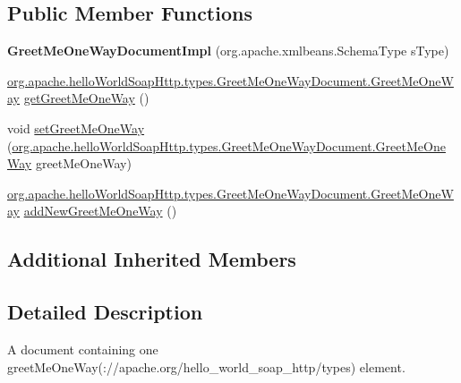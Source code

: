 \subsection*{Public Member Functions}
\begin{DoxyCompactItemize}
\item 
\hypertarget{classorg_1_1apache_1_1hello_world_soap_http_1_1types_1_1impl_1_1_greet_me_one_way_document_impl_af091cb75db4bc43ff7feea9878852f23}{}{\bfseries Greet\+Me\+One\+Way\+Document\+Impl} (org.\+apache.\+xmlbeans.\+Schema\+Type s\+Type)\label{classorg_1_1apache_1_1hello_world_soap_http_1_1types_1_1impl_1_1_greet_me_one_way_document_impl_af091cb75db4bc43ff7feea9878852f23}

\item 
\hyperlink{interfaceorg_1_1apache_1_1hello_world_soap_http_1_1types_1_1_greet_me_one_way_document_1_1_greet_me_one_way}{org.\+apache.\+hello\+World\+Soap\+Http.\+types.\+Greet\+Me\+One\+Way\+Document.\+Greet\+Me\+One\+Way} \hyperlink{classorg_1_1apache_1_1hello_world_soap_http_1_1types_1_1impl_1_1_greet_me_one_way_document_impl_a321eea1bbf1c4738ba8a4d98b4a46f99}{get\+Greet\+Me\+One\+Way} ()
\item 
void \hyperlink{classorg_1_1apache_1_1hello_world_soap_http_1_1types_1_1impl_1_1_greet_me_one_way_document_impl_acca78c5d078d93d078efd3589d552f1f}{set\+Greet\+Me\+One\+Way} (\hyperlink{interfaceorg_1_1apache_1_1hello_world_soap_http_1_1types_1_1_greet_me_one_way_document_1_1_greet_me_one_way}{org.\+apache.\+hello\+World\+Soap\+Http.\+types.\+Greet\+Me\+One\+Way\+Document.\+Greet\+Me\+One\+Way} greet\+Me\+One\+Way)
\item 
\hyperlink{interfaceorg_1_1apache_1_1hello_world_soap_http_1_1types_1_1_greet_me_one_way_document_1_1_greet_me_one_way}{org.\+apache.\+hello\+World\+Soap\+Http.\+types.\+Greet\+Me\+One\+Way\+Document.\+Greet\+Me\+One\+Way} \hyperlink{classorg_1_1apache_1_1hello_world_soap_http_1_1types_1_1impl_1_1_greet_me_one_way_document_impl_a2823dc48a1fa20c3259ac2cac8f5947e}{add\+New\+Greet\+Me\+One\+Way} ()
\end{DoxyCompactItemize}
\subsection*{Additional Inherited Members}


\subsection{Detailed Description}
A document containing one greet\+Me\+One\+Way(\+://apache.org/hello\+\_\+world\+\_\+soap\+\_\+http/types) element.

